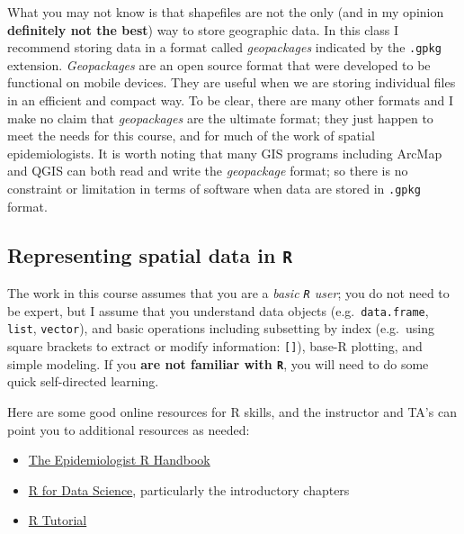 \documentclass[
]{book}
\providecommand{\tightlist}{%
  \setlength{\itemsep}{0pt}\setlength{\parskip}{0pt}}
\newenvironment{rmdtip}[1]
  {
  \begin{itemize}
  \renewcommand{\labelitemi}{
    \raisebox{-.7\height}[0pt][0pt]{
      {\setkeys{Gin}{width=3em,keepaspectratio}\texttt{[image: images/\#1]}}
    }
  }
  \setlength{\fboxsep}{1em}
  \begin{tip}
  \item
  }
  {
  \end{tip}
  \end{itemize}
  }
\begin{document}
What you may not know is that shapefiles are not the only (and in my opinion \textbf{definitely not the best}) way to store geographic data. In this class I recommend storing data in a format called \emph{geopackages} indicated by the \texttt{.gpkg} extension. \emph{Geopackages} are an open source format that were developed to be functional on mobile devices. They are useful when we are storing individual files in an efficient and compact way. To be clear, there are many other formats and I make no claim that \emph{geopackages} are the ultimate format; they just happen to meet the needs for this course, and for much of the work of spatial epidemiologists. It is worth noting that many GIS programs including ArcMap and QGIS can both read and write the \emph{geopackage} format; so there is no constraint or limitation in terms of software when data are stored in \texttt{.gpkg} format.

\hypertarget{representing-spatial-data-in-r}{%
\subsection{\texorpdfstring{Representing spatial data in \texttt{R}}{Representing spatial data in R}}\label{representing-spatial-data-in-r}}

The work in this course assumes that you are a \emph{basic \texttt{R} user}; you do not need to be expert, but I assume that you understand data objects (e.g.~\texttt{data.frame}, \texttt{list}, \texttt{vector}), and basic operations including subsetting by index (e.g.~using square brackets to extract or modify information: \texttt{{[}{]}}), base-R plotting, and simple modeling. If you \textbf{are not familiar with \texttt{R}}, you will need to do some quick self-directed learning.

\begin{rmdtip}{tip}

Here are some good online resources for R skills, and the instructor and TA's can point you to additional resources as needed:

\begin{itemize}
\tightlist
\item
  \href{https://epirhandbook.com/index.html}{The Epidemiologist R Handbook}
\item
  \href{https://r4ds.had.co.nz/introduction.html}{R for Data Science}, particularly the introductory chapters
\item
  \href{http://www.r-tutor.com/r-introduction}{R Tutorial}
\end{itemize}

\end{rmdtip}
\end{document}

